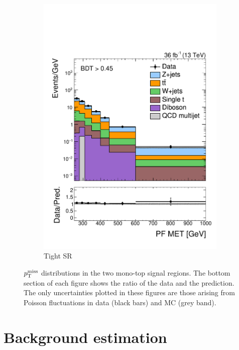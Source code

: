 \begin{figure}[]
\begin{center}
\begin{subfigure}[t]{0.49\textwidth}
            \includegraphics[width=\textwidth]{figures/monotop/prefit/signal_tight_pfmet_logy.pdf}
            \caption{Tight SR}
        \end{subfigure}
        \caption{$p_\mathrm{T}^\mathrm{miss}$ distributions in the two mono-top signal regions.
                 The bottom section of each figure shows the ratio of the data and the prediction.
                 The only uncertainties plotted in these figures are those arising from Poisson fluctuations in data (black bars) and MC (grey band).}
        \label{fig:mt:prefit_signal}
    \end{center}
\end{figure}

\clearpage

\section{Background estimation}
\label{sec:mt:bkg}

